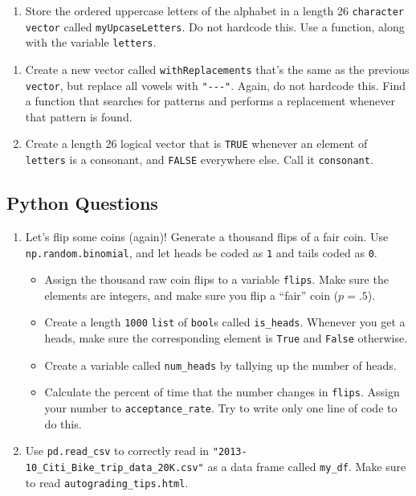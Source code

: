 \documentclass[
  12pt,
  krantz2]{krantz}
\providecommand{\tightlist}{%
  \setlength{\itemsep}{0pt}\setlength{\parskip}{0pt}}
\begin{document}
\begin{enumerate}
\def\labelenumi{\arabic{enumi}.}
\setcounter{enumi}{3}
\tightlist
\item
  Store the ordered uppercase letters of the alphabet in a length \(26\) \texttt{character} \texttt{vector} called \texttt{myUpcaseLetters}. Do not hardcode this. Use a function, along with the variable \texttt{letters}.
\end{enumerate}

\begin{enumerate}
\def\labelenumi{\alph{enumi}.}
\item
  Create a new vector called \texttt{withReplacements} that's the same as the previous \texttt{vector}, but replace all vowels with \texttt{"-\/-\/-"}. Again, do not hardcode this. Find a function that searches for patterns and performs a replacement whenever that pattern is found.
\item
  Create a length \(26\) logical vector that is \texttt{TRUE} whenever an element of \texttt{letters} is a consonant, and \texttt{FALSE} everywhere else. Call it \texttt{consonant}.
\end{enumerate}

\hypertarget{python-questions-1}{%
\subsection{Python Questions}\label{python-questions-1}}

\begin{enumerate}
\def\labelenumi{\arabic{enumi}.}
\item
  Let's flip some coins (again)! Generate a thousand flips of a fair coin. Use \texttt{np.random.binomial}, and let heads be coded as \texttt{1} and tails coded as \texttt{0}.

  \begin{itemize}
  \tightlist
  \item
    Assign the thousand raw coin flips to a variable \texttt{flips}. Make sure the elements are integers, and make sure you flip a ``fair'' coin (\(p=.5\)).
  \item
    Create a length \texttt{1000} \texttt{list} of \texttt{bool}s called \texttt{is\_heads}. Whenever you get a heads, make sure the corresponding element is \texttt{True} and \texttt{False} otherwise.
  \item
    Create a variable called \texttt{num\_heads} by tallying up the number of heads.
  \item
    Calculate the percent of time that the number changes in \texttt{flips}. Assign your number to \texttt{acceptance\_rate}. Try to write only one line of code to do this.
  \end{itemize}
\item
  Use \texttt{pd.read\_csv} to correctly read in \texttt{"2013-10\_Citi\_Bike\_trip\_data\_20K.csv"} as a data frame called \texttt{my\_df}. Make sure to read \texttt{autograding\_tips.html}.
\end{enumerate}
\end{document}
